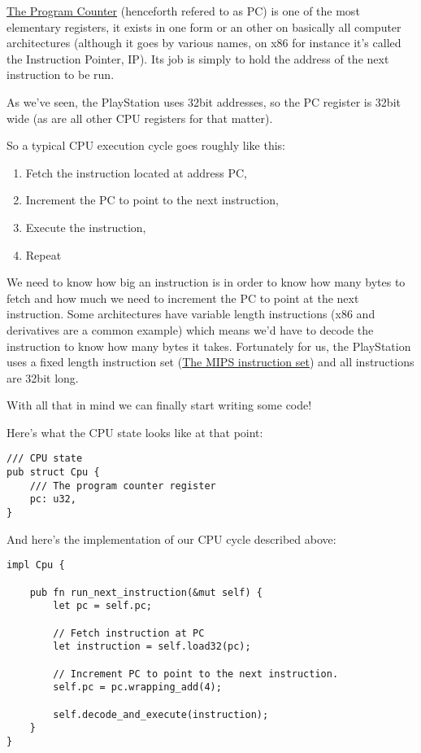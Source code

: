 \documentclass[a4paper]{article}
\begin{document}
\href{https://en.wikipedia.org/wiki/Program_counter}{The Program
  Counter} (henceforth refered to as PC) is one of the most
elementary registers, it exists in one form or an other on basically
all computer architectures (although it goes by various names, on x86
for instance it's called the Instruction Pointer, IP). Its
job is simply to hold the address of the next instruction to be run.

As we've seen, the PlayStation uses 32bit addresses, so the PC
register is 32bit wide (as are all other CPU registers for that
matter).

So a typical CPU execution cycle goes roughly like this:

\begin{enumerate}
  \item Fetch the instruction located at address PC,
  \item Increment the PC to point to the next instruction,
  \item Execute the instruction,
  \item Repeat
\end{enumerate}

We need to know how big an instruction is in order to know how many
bytes to fetch and how much we need to increment the PC to
point at the next instruction. Some architectures have variable length
instructions (x86 and derivatives are a common example) which means
we'd have to decode the instruction to know how many bytes it
takes. Fortunately for us, the PlayStation uses a fixed length
instruction set
(\href{https://en.wikipedia.org/wiki/MIPS_instruction_set}{The MIPS
  instruction set}) and all instructions are 32bit long.

With all that in mind we can finally start writing some code!

Here's what the CPU state looks like at that point:

\begin{lstlisting}
/// CPU state
pub struct Cpu {
    /// The program counter register
    pc: u32,
}
\end{lstlisting}

And here's the implementation of our CPU cycle described above:

\begin{lstlisting}
impl Cpu {

    pub fn run_next_instruction(&mut self) {
        let pc = self.pc;

        // Fetch instruction at PC
        let instruction = self.load32(pc);

        // Increment PC to point to the next instruction.
        self.pc = pc.wrapping_add(4);

        self.decode_and_execute(instruction);
    }
}
\end{lstlisting}
\end{document}
